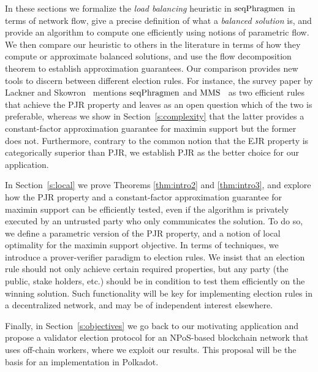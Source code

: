 In these sections we formalize the \emph{load balancing} heuristic in $\operatorname{seqPhragmen}$ in terms of network flow, give a precise definition of what a \emph{balanced solution} is, and provide an algorithm to compute one efficiently using notions of parametric flow. We then compare our heuristic to others in the literature in terms of how they compute or approximate balanced solutions, and use the flow decomposition theorem to establish approximation guarantees. Our comparison provides new tools to discern between different election rules. For instance, the survey paper by Lackner and Skowron~\cite{lackner2020approval} mentions $\operatorname{seqPhragmen}$ and $\operatorname{MMS}$~\cite{sanchez2016maximin} as two efficient rules that achieve the PJR property and leaves as an open question which of the two is preferable, whereas we show in Section~\ref{s:complexity} that the latter provides a constant-factor approximation guarantee for maximin support but the former does not. 
Furthermore, contrary to the common notion that the EJR property is categorically superior than PJR, we establish PJR as the better choice for our application.

In Section~\ref{s:local} we prove Theorems \ref{thm:intro2} and \ref{thm:intro3}, and explore how the PJR property and a constant-factor approximation guarantee for maximin support can be efficiently tested, even if the algorithm is privately executed by an untrusted party who only communicates the solution. 
To do so, we define a parametric version of the PJR property, and a notion of local optimality for the maximin support objective. 
In terms of techniques, we introduce a prover-verifier paradigm to election rules. We insist that an election rule should not only achieve certain required properties, but any party (the public, stake holders, etc.) should be in condition to test them efficiently on the winning solution. Such functionality will be key for implementing election rules in a decentralized network, and may be of independent interest elsewhere. 

Finally, in Section~\ref{s:objectives} we go back to our motivating application and propose a validator election protocol for an NPoS-based blockchain network that uses off-chain workers, where we exploit our results. This proposal will be the basis for an implementation in Polkadot. 
